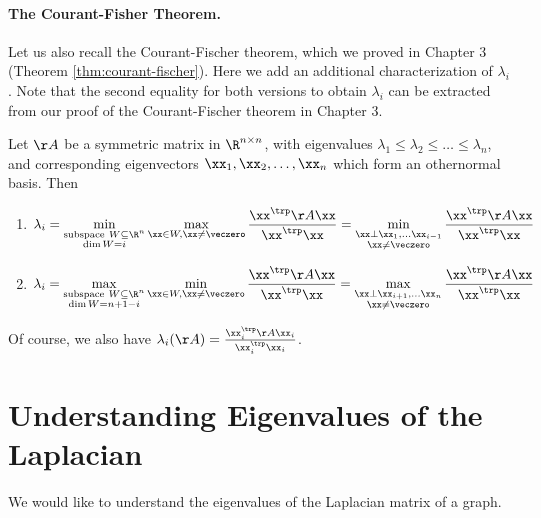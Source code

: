 \paragraph{The Courant-Fisher Theorem.} Let us also recall the
Courant-Fischer theorem, which we proved in Chapter 3 (Theorem \ref{thm:courant-fischer}). Here we add an additional characterization of $\lambda_i$. Note that the second equality for both versions to obtain $\lambda_i$ can be extracted from our proof of the Courant-Fischer theorem in Chapter 3.

\begin{theorem}
  \label{thm:courant-fischeragain-eigvec}
    \label{thm:courant-fischeragain}

  Let $\AA$ be a symmetric matrix in $\R^{n\times n}$, with
  eigenvalues $\lambda_1\leq \lambda_2 \leq \ldots \leq \lambda_n$,
  and corresponding eigenvectors $\xx_1, \xx_2, \ldots, \xx_n$ which
  form an othernormal basis.
  Then
  \begin{enumerate}
  \item
  \label{thm:courant-fischeragain-eigvec:minmax}
    \[
    \lambda_i = \min_{
      \substack{
        \mathrm{subspace~} W \subseteq \R^n
        \\
        \dim{W} = i
      }
    }
    \max_{
      \xx \in W, \xx \neq \veczero
    }
    \frac{\xx^\trp \AA\xx}{\xx^\trp\xx} = 
    \min_{
      \substack{ \xx \perp \xx_1, \ldots \xx_{i-1}
        \\ \xx \neq \veczero}
    }
    \frac{\xx^\trp \AA\xx}{\xx^\trp\xx}
  \]
\item
  \label{thm:courant-fischeragain2:maxmin}
    \[
    \lambda_i = \max_{
      \substack{
        \mathrm{subspace~} W \subseteq \R^n
        \\
        \dim{W} = n+1-i
      }
    }
    \min_{
      \xx \in W, \xx \neq \veczero
    }
    \frac{\xx^\trp \AA\xx}{\xx^\trp\xx}
     =
    \max_{
      \substack{  \xx \perp \xx_{i+1}, \ldots \xx_{n}
        \\ \xx \neq \veczero}
    }
    \frac{\xx^\trp \AA\xx}{\xx^\trp\xx}
    \]
  \end{enumerate}
\end{theorem}

Of course, we also have $\lambda_i(\AA) = \frac{\xx_i ^\trp \AA \xx_i
}{\xx_i^\trp\xx_i}$.
\section{Understanding Eigenvalues of the Laplacian}
We would like to understand the eigenvalues of the Laplacian matrix of
a graph.

